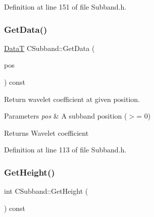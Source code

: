 Definition at line 151 of file Subband.\+h.


\begin{DoxyCode}{0}

\end{DoxyCode}
\mbox{\label{classCSubband_af3b0eb40a0887219e6caaeb5cb394f63}} 
\subsubsection{\texorpdfstring{GetData()}{GetData()}}
{\footnotesize\ttfamily \mbox{\hyperlink{PGFtypes_8h_acb1ee3f52ccfad782dcaa0abd79e5d05}{DataT}} C\+Subband\+::\+Get\+Data (\begin{DoxyParamCaption}\item[{U\+I\+N\+T32}]{pos }\end{DoxyParamCaption}) const\hspace{0.3cm}{\ttfamily [inline]}}

Return wavelet coefficient at given position. 
\begin{DoxyParams}{Parameters}
{\em pos} & A subband position ($>$= 0) \\
\hline
\end{DoxyParams}
\begin{DoxyReturn}{Returns}
Wavelet coefficient 
\end{DoxyReturn}


Definition at line 113 of file Subband.\+h.


\begin{DoxyCode}{0}

\end{DoxyCode}
\mbox{\label{classCSubband_ab318beb155b4526adf67f91ea1c4b930}} 
\subsubsection{\texorpdfstring{GetHeight()}{GetHeight()}}
{\footnotesize\ttfamily int C\+Subband\+::\+Get\+Height (\begin{DoxyParamCaption}{ }\end{DoxyParamCaption}) const\hspace{0.3cm}{\ttfamily [inline]}}

